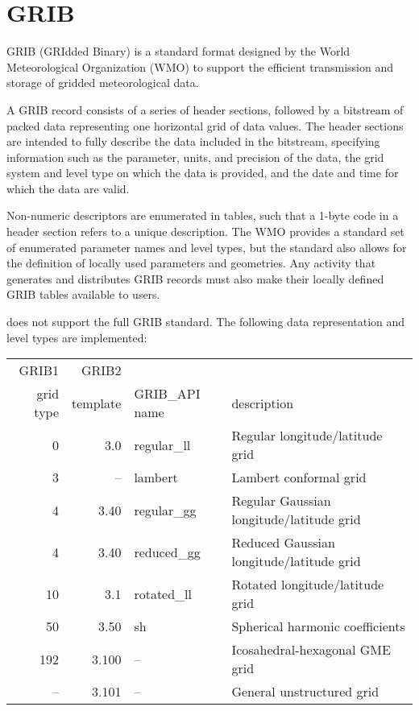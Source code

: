 
\section{GRIB}

GRIB \cite{GRIB} (GRIdded Binary) is a standard format designed by the
World Meteorological Organization (WMO) to support the efficient 
transmission and storage of gridded meteorological data.

A GRIB record consists of a series of header sections, followed by
a bitstream of packed data representing one horizontal grid of data
values. The header sections are intended to fully describe the data
included in the bitstream, specifying information such as the
parameter, units, and precision of the data, the grid system and
level type on which the data is provided, and the date and time
for which the data are valid.

Non-numeric descriptors are enumerated in tables, such that a 1-byte
code in a header section refers to a unique description.
The WMO provides a standard set of enumerated parameter names and
level types, but the standard also allows for the definition
of locally used parameters and geometries. Any activity
that generates and distributes GRIB records must also make
their locally defined GRIB tables available to users.

{\CDI} does not support the full GRIB standard. The following
data representation and level types are implemented: \\

\begin{tabular}{|r|r|l|l|}
\hline
\rowcolor[gray]{.9}
GRIB1  & GRIB2 & & \\
\rowcolor[gray]{.9}
 grid type &  template & GRIB\_API name & description \\
     0  & 3.0 & regular\_ll & Regular longitude/latitude grid \\
     3  & -- & lambert & Lambert conformal grid \\
     4  & 3.40 & regular\_gg & Regular Gaussian longitude/latitude grid \\
     4  & 3.40 & reduced\_gg & Reduced Gaussian longitude/latitude grid \\
   10  & 3.1 & rotated\_ll & Rotated  longitude/latitude grid \\
   50  & 3.50 & sh & Spherical harmonic coefficients \\
 192  & 3.100 & -- & Icosahedral-hexagonal GME grid \\
  --   & 3.101 & -- & General unstructured grid \\
\hline
\end{tabular}


